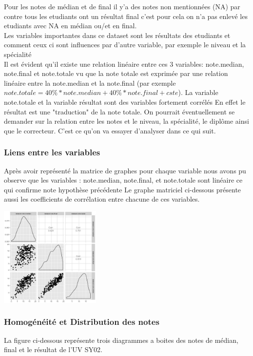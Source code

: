 \documentclass[10pt]{article}
\begin{document}
	Pour les notes de médian et de final il y'a des notes non mentionnées (NA) par contre tous les etudiants ont un résultat final c'est pour cela on n'a pas enlevé les etudiants avec NA en médian ou/et en final.\\
	Les variables importantes dans ce dataset sont les résultats des etudiants et comment ceux ci sont influences par d'autre variable, par exemple le niveau et la spécialité\\
	Il est évident qu'il existe une relation linéaire entre ces 3 variables: note.median, note.final et note.totale vu que la note totale est exprimée par une relation linéaire entre la note.median et la note.final (par exemple $note.totale = 40\% * note.median + 40\% * note.final + cste$). La variable note.totale et la variable résultat sont des variables fortement corrélés En effet le résultat est une "traduction"  de la note totale. On pourrait éventuellement se demander sur la relation entre les notes et le niveau, la spécialité, le diplôme ainsi que le correcteur. C'est ce qu'on va essayer d'analyser dans ce qui suit. 
	
	\subsubsection{Liens entre les variables}
	Après avoir représenté la matrice de graphes pour chaque variable nous avons pu observe que les variables : note.median, note.final, et note.totale sont linéaire ce qui confirme note hypothèse précédente Le graphe matriciel ci-dessous présente aussi les coefficients de corrélation entre chacune de ces variables.
	
	\begin{center}
		\includegraphics[width=50mm]{Figures/Notes/corr_notes.jpg}
		\label{fig:multiplot_notes}
	\end{center}
	
	
	\subsubsection{Homogénéité et Distribution des notes}
	La figure ci-dessous représente trois diagrammes a boites des notes de médian, final et le résultat de l'UV SY02. 
	
\end{document}
